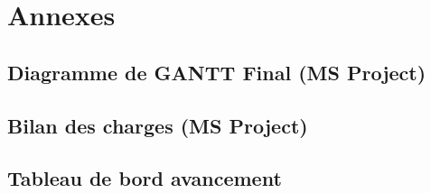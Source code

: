 \section{Annexes}

       \subsection{Diagramme de GANTT Final (MS Project)}

       \subsection{Bilan des charges (MS Project)}

       \subsection{Tableau de bord avancement}





